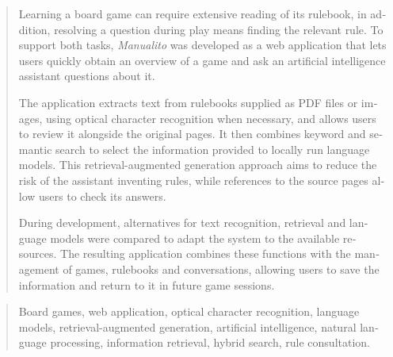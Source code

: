 \documentclass[a4paper,12pt,oneside,openleft]{memoir}
\begin{document}
\begin{otherlanguage}{english}
\renewcommand*\abstractname{Abstract}
\begin{abstract}
Learning a board game can require extensive reading of its rulebook,
in addition, resolving a question during play means finding the relevant rule.
To support both tasks, \textit{Manualito} was developed as a web application
that lets users quickly obtain an overview of a game and ask an artificial
intelligence assistant questions about it.

The application extracts text from rulebooks supplied as \acs{PDF} files or
images, using optical character recognition when necessary, and allows
users to review it alongside the original pages. It then combines keyword
and semantic search to select the information provided to locally run
language models. This retrieval-augmented generation approach aims to
reduce the risk of the assistant inventing rules, while references to the
source pages allow users to check its answers.

During development, alternatives for text recognition, retrieval and
language models were compared to adapt the system to the available
resources. The resulting application combines these functions with the
management of games, rulebooks and conversations, allowing users to save
the information and return to it in future game sessions.
\end{abstract}

\renewcommand*\abstractname{Keywords}
\begin{abstract}
Board games, web application, optical character recognition, language models,
retrieval-augmented generation, artificial intelligence, natural language
processing, information retrieval, hybrid search, rule consultation.
\end{abstract}
\end{otherlanguage}

\clearpage

\tableofcontents

\clearpage

\listoffigures

\clearpage

\listoftables

\clearpage
\end{document}
